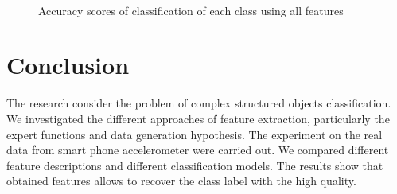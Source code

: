 \documentclass{llncs}
\begin{document}
\begin{figure}[!ht]
	\\
	\caption{Accuracy scores of classification of each class using all features}
	\label{fig::feature_union_results}
\end{figure}

\section{Conclusion}

The research consider the problem of complex structured objects classification.
We investigated the different approaches of feature extraction, particularly the expert functions and data generation hypothesis. 
The experiment on the real data from smart phone accelerometer were carried out. 
We compared different feature descriptions and different classification models. 
The results show that obtained features allows to recover the class label with the high quality.


\end{document}
